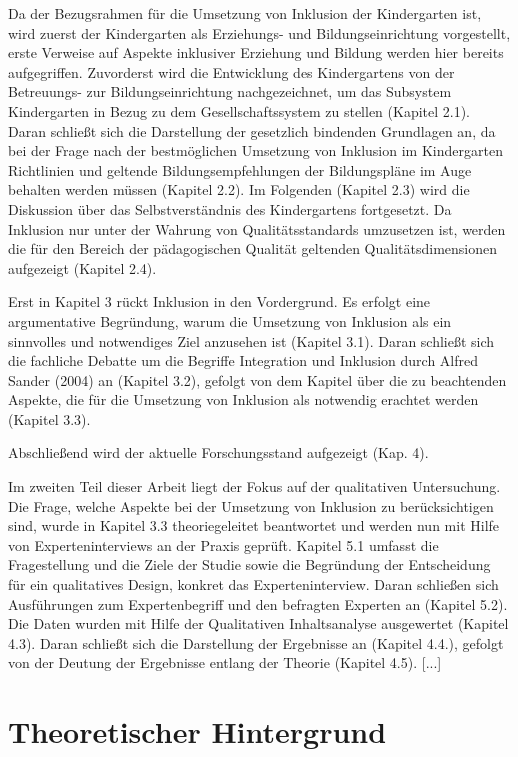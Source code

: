 Da der Bezugsrahmen für die Umsetzung von Inklusion der Kindergarten ist, wird zuerst der Kindergarten als Erziehungs- und Bildungseinrichtung vorgestellt, erste Verweise auf Aspekte inklusiver Erziehung und Bildung werden hier bereits aufgegriffen.  
Zuvorderst wird die Entwicklung des Kindergartens von der Betreuungs- zur Bildungseinrichtung nachgezeichnet, um das Subsystem Kindergarten in Bezug zu dem Gesellschaftssystem zu stellen (Kapitel 2.1). Daran schließt sich die Darstellung der gesetzlich bindenden Grundlagen an, da bei der Frage nach der bestmöglichen Umsetzung von Inklusion im Kindergarten Richtlinien und geltende Bildungsempfehlungen der Bildungspläne im Auge behalten werden müssen (Kapitel 2.2).    
Im Folgenden (Kapitel 2.3) wird die Diskussion über das Selbstverständnis des Kindergartens fortgesetzt.
Da Inklusion nur unter der Wahrung von Qualitätsstandards umzusetzen ist, werden die für den Bereich der pädagogischen Qualität geltenden Qualitätsdimensionen aufgezeigt (Kapitel 2.4).

Erst in Kapitel 3 rückt Inklusion in den Vordergrund. Es erfolgt eine argumentative Begründung, warum die Umsetzung von Inklusion als ein sinnvolles und notwendiges Ziel anzusehen ist (Kapitel 3.1). Daran schließt sich die fachliche Debatte um die Begriffe Integration und Inklusion durch Alfred Sander (2004) an (Kapitel 3.2), gefolgt von dem Kapitel über die zu beachtenden Aspekte, die für die Umsetzung von Inklusion als notwendig erachtet werden (Kapitel 3.3).
 
Abschließend wird der aktuelle Forschungsstand aufgezeigt (Kap. 4).
   
Im zweiten Teil dieser Arbeit liegt der Fokus auf der qualitativen Untersuchung. Die Frage, welche Aspekte bei der Umsetzung von Inklusion zu berücksichtigen sind, wurde in Kapitel 3.3 theoriegeleitet beantwortet und werden nun mit Hilfe von Experteninterviews an der Praxis geprüft.
Kapitel 5.1 umfasst die Fragestellung und die Ziele der Studie sowie die Begründung der Entscheidung für ein qualitatives Design, konkret das Experteninterview. Daran schließen sich Ausführungen zum  Expertenbegriff und den befragten Experten an (Kapitel 5.2). Die Daten wurden mit Hilfe der Qualitativen Inhaltsanalyse ausgewertet (Kapitel 4.3). Daran schließt sich die Darstellung der Ergebnisse an (Kapitel 4.4.), gefolgt von der Deutung der Ergebnisse entlang der Theorie (Kapitel 4.5). [...] 

\part{Theoretischer Hintergrund}
